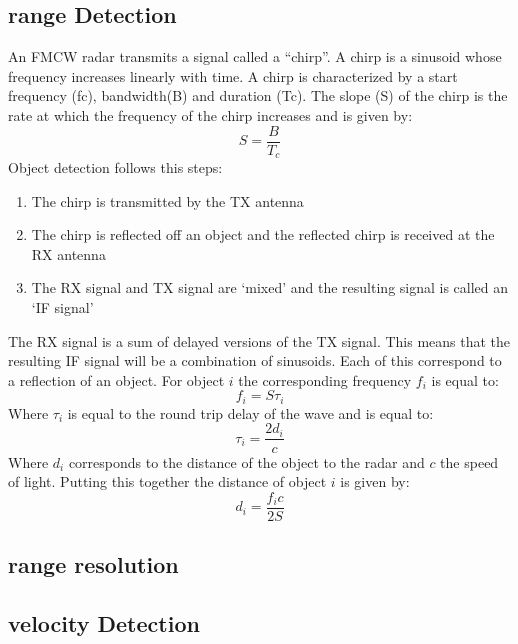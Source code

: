 \subsection{range Detection}
An FMCW radar transmits a signal called a “chirp”. A chirp is a sinusoid whose frequency  increases linearly with time.
A chirp is characterized by a start frequency (fc), bandwidth(B) and duration (Tc). The slope (S) of the chirp is the rate at which the frequency of the chirp increases and is given by:
\begin{equation}
    S=\frac{B}{T_c}
\end{equation}
Object detection follows this steps:
\begin{enumerate}
    \item The chirp is transmitted by the TX antenna
    \item The chirp is reflected off an object and the reflected chirp is received at the RX antenna
    \item The RX signal and TX signal are ‘mixed’ and the resulting signal is called an ‘IF signal’
\end{enumerate}


The RX signal is a sum of delayed versions of the TX signal. This means that the resulting IF signal will be a combination of sinusoids. Each of this correspond to a reflection of an object. For object $i$ the corresponding frequency $f_i$ is equal to:
\begin{equation}
    f_i=S\tau_i
\end{equation}
Where $\tau_i$ is equal to the round trip delay of the wave and is equal to:
\begin{equation}
    \tau_i=\frac{2d_i}{c}
\end{equation}
Where $d_i$ corresponds to the distance of the object to the radar and $c$ the speed of light.
Putting this together the distance of object $i$ is given by:
\begin{equation}
    d_i=\frac{f_ic}{2S}
\end{equation}
\subsection{range resolution}
\subsection{velocity Detection}

